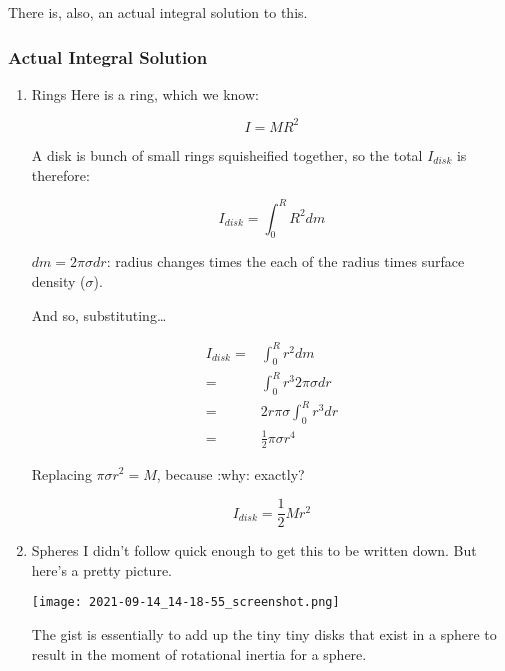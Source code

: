 \documentclass[letterpaper]{article}
\begin{document}
There is, also, an actual integral solution to this.

\subsubsection{Actual Integral Solution}
\label{sec:orgc86ef49}

\begin{enumerate}
\item Rings
\label{sec:org10985d0}
Here is a ring, which we know:

\begin{equation}
    I= MR^2
\end{equation}

A disk is bunch of small rings squisheified together, so the total \(I_{disk}\) is therefore:

\begin{equation}
    I_{disk} = \int^R_0 R^2 dm
\end{equation}

\(dm = 2\pi \sigma dr\): radius changes times the each of the radius times surface density (\(\sigma\)).

And so, substituting\ldots{}

\begin{align}
    I_{disk} =& \int^R_0 r^2 dm \\
    =& \int^R_0 r^3 2 \pi \sigma dr \\
    =& 2r\pi\sigma \int^R_0 r^3 dr \\
    =& \frac{1}{2}\pi\sigma r^4
\end{align}

Replacing \(\pi \sigma r^2 = M\), because :why: exactly?

\begin{equation}
    I_{disk} = \frac{1}{2}Mr^2
\end{equation}

\item Spheres
\label{sec:org5632285}
I didn't follow quick enough to get this to be written down. But here's a pretty picture.


\begin{center}
\texttt{[image: 2021-09-14\_14-18-55\_screenshot.png]}
\end{center}

The gist is essentially to add up the tiny tiny disks that exist in a sphere to result in the moment of rotational inertia for a sphere.
\end{enumerate}
\end{document}
